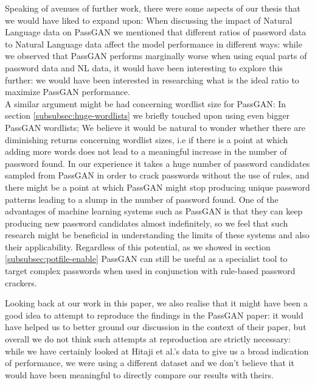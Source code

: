 Speaking of avenues of further work, there were some aspects of our thesis that we would have liked to expand upon:
When discussing the impact of Natural Language data on PassGAN we mentioned that different ratios of password data to Natural Language data affect the model performance in different ways: while we observed 
that PassGAN performs marginally worse when using equal parts of password data and NL data, it would have been interesting to explore this further: we would have been interested in researching what is the ideal ratio to maximize PassGAN performance. \\
A similar argument might be had concerning wordlist size for PassGAN: In section \ref{subsubsec:huge-wordlists} we briefly touched upon using even bigger PassGAN wordlists; We believe it would be natural to wonder whether there are diminishing returns concerning wordlist sizes, i.e if there is a point at which adding more words does not lead to a meaningful increase in the number of password found.
In our experience it takes a huge number of password candidates sampled from PassGAN in order to crack passwords without the use of rules, and there might be a point at which PassGAN might stop producing 
unique password patterns leading to a slump in the number of password found. One of the advantages of machine learning systems such as PassGAN is that they can keep producing new password candidates almost 
indefinitely, so we feel that such research might be beneficial in understanding the limits of these systems and also their applicability. Regardless of this potential, as we showed in section 
\ref{subsubsec:potfile-enable} PassGAN can still be useful as a specialist tool to target complex passwords when used in conjunction with rule-based password crackers.

Looking back at our work in this paper, we also realise that it might have been a good idea to attempt to reproduce the findings in the PassGAN paper: it would have helped us to better ground our discussion 
in the context of their paper, but overall we do not think such attempts at reproduction are strictly necessary: while we have certainly looked at Hitaji et al.'s data to give us a broad indication of performance, we were using a different dataset and we don't believe that it would have been meaningful to directly compare our results with theirs.

